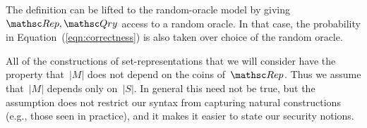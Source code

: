 \noindent
The definition can be lifted to the random-oracle model
by giving $\Rep, \Qry$ access to a random oracle. In that case,
the probability in Equation~(\ref{eqn:correctness}) is also taken over choice of the random oracle.

All of the constructions of set-representations that we will consider have the property that~$|M|$ does not depend on the coins of~$\Rep$. Thus we assume that~$|M|$ depends only on~$|S|$.  In general this need not be true, but the assumption does not restrict our syntax from capturing natural constructions (e.g., those seen in practice), and it makes it easier to state our security notions.
%


